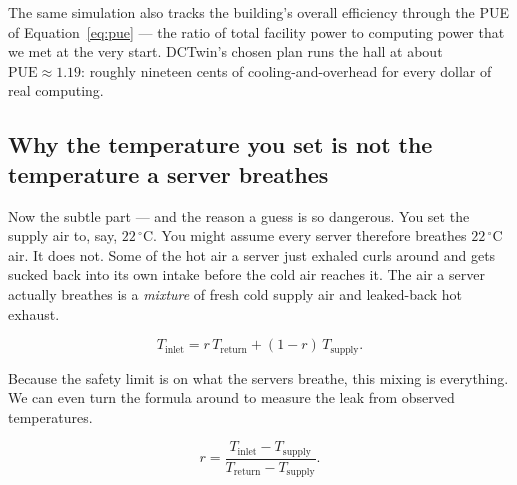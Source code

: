 The same simulation also tracks the building's overall efficiency through the PUE of Equation~\ref{eq:pue} --- the ratio of total facility power to computing power that we met at the very start. DCTwin's chosen plan runs the hall at about $\mathrm{PUE} \approx 1.19$: roughly nineteen cents of cooling-and-overhead for every dollar of real computing.

\subsection*{Why the temperature you set is not the temperature a server breathes}

Now the subtle part --- and the reason a guess is so dangerous. You set the supply air to, say, $22\,^\circ$C. You might assume every server therefore breathes $22\,^\circ$C air. It does not. Some of the hot air a server just exhaled curls around and gets sucked back into its own intake before the cold air reaches it. The air a server actually breathes is a \emph{mixture} of fresh cold supply air and leaked-back hot exhaust.

\begin{equation}\label{eq:inlet-mixing}
T_{\text{inlet}} = r\,T_{\text{return}} + (1-r)\,T_{\text{supply}}.
\end{equation}

Because the safety limit is on what the servers breathe, this mixing is everything. We can even turn the formula around to measure the leak from observed temperatures.

\begin{equation}\label{eq:recirc-solve}
r = \frac{T_{\text{inlet}} - T_{\text{supply}}}{T_{\text{return}} - T_{\text{supply}}}.
\end{equation}


